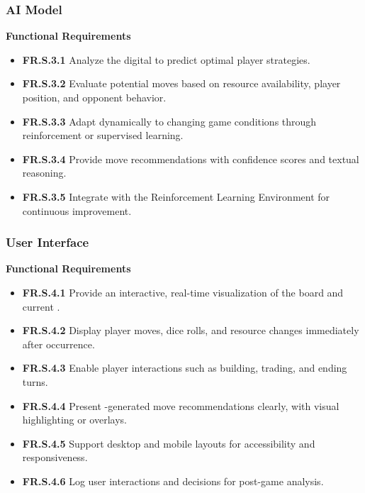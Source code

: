 \documentclass{article}
\begin{document}
\subsubsection{AI Model}

\textbf{Functional Requirements}

\begin{itemize}
  \item \label{FR.S.3.1}\textbf{FR.S.3.1} Analyze the digital \GameState{} to predict optimal player strategies.
  \item \label{FR.S.3.2}\textbf{FR.S.3.2} Evaluate potential moves based on resource availability, player position, and opponent behavior.
  \item \label{FR.S.3.3}\textbf{FR.S.3.3} Adapt dynamically to changing game conditions through reinforcement or supervised learning.
  \item \label{FR.S.3.4}\textbf{FR.S.3.4} Provide move recommendations with confidence scores and textual reasoning.
  \item \label{FR.S.3.5}\textbf{FR.S.3.5} Integrate with the Reinforcement Learning Environment for continuous improvement.
\end{itemize}

\subsubsection{User Interface}

\textbf{Functional Requirements}

\begin{itemize}
  \item \label{FR.S.4.1}\textbf{FR.S.4.1} Provide an interactive, real-time visualization of the \emph{\Catan{}} board and current \GameState{}.
  \item \label{FR.S.4.2}\textbf{FR.S.4.2} Display player moves, dice rolls, and resource changes immediately after occurrence.
  \item \label{FR.S.4.3}\textbf{FR.S.4.3} Enable player interactions such as building, trading, and ending turns.
  \item \label{FR.S.4.4}\textbf{FR.S.4.4} Present \AI{}-generated move recommendations clearly, with visual highlighting or overlays.
  \item \label{FR.S.4.5}\textbf{FR.S.4.5} Support desktop and mobile layouts for accessibility and responsiveness.
  \item \label{FR.S.4.6}\textbf{FR.S.4.6} Log user interactions and decisions for post-game analysis.
\end{itemize}
\end{document}
